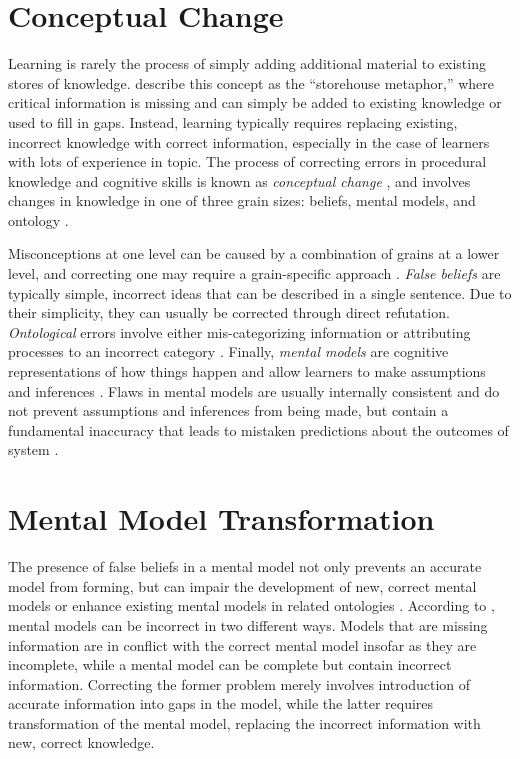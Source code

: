 \section{Conceptual Change}

Learning is rarely the process of simply adding additional material to existing stores of knowledge. \citet{Klein2006} describe this concept as the ``storehouse metaphor,'' where critical information is missing and can simply be added to existing knowledge or used to fill in gaps. Instead, learning typically requires replacing existing, incorrect knowledge with correct information, especially in the case of learners with lots of experience in topic. The process of correcting errors in procedural knowledge and cognitive skills is known as \emph{conceptual change} \citep{Chi2008}, and involves changes in knowledge in one of three grain sizes: beliefs, mental models, and ontology \citep{Gadgil2012}.

Misconceptions at one level can be caused by a combination of grains at a lower level, and correcting one may require a grain-specific approach \citep{Gadgil2012}. \emph{False beliefs} are typically simple, incorrect ideas that can be described in a single sentence. Due to their simplicity, they can usually be corrected through direct refutation. \emph{Ontological} errors involve either mis-categorizing information or attributing processes to an incorrect category \citep{Chi1994}. Finally, \emph{mental models} are cognitive representations of how things happen \citep{Klein2006} and allow learners to make assumptions and inferences \citep{Gadgil2012}. Flaws in mental models are usually internally consistent and do not prevent assumptions and inferences from being made, but contain a fundamental inaccuracy that leads to mistaken predictions about the outcomes of system \citep{Vosniadou1994}.

\section{Mental Model Transformation}

The presence of false beliefs in a mental model not only prevents an accurate model from forming, but can impair the development of new, correct mental models or enhance existing mental models in related ontologies \citep{Jacobson2013}. According to \citet{Chi2008}, mental models can be incorrect in two different ways. Models that are missing information are in conflict with the correct mental model insofar as they are incomplete, while a mental model can be complete but contain incorrect information. Correcting the former problem merely involves introduction of accurate information into gaps in the model, while the latter requires transformation of the mental model, replacing the incorrect information with new, correct knowledge.

